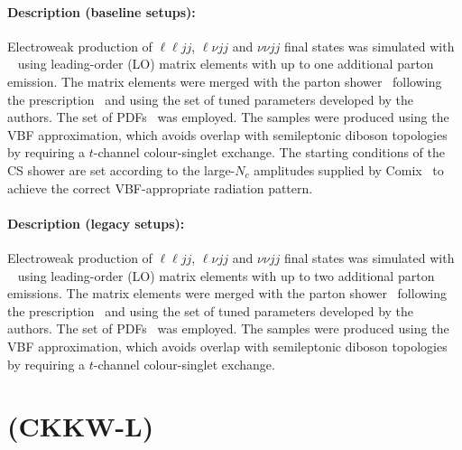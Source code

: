 \paragraph{Description (baseline setups):}

Electroweak production of \(\ell\ell jj\), \(\ell\nu jj\) and \(\nu\nu jj\) final states
was simulated with \SHERPA[2.2.11]~\cite{Bothmann:2019yzt} using
leading-order (LO) matrix elements with up to one additional parton emission.
The matrix elements were merged with the \SHERPA parton
shower~\cite{Schumann:2007mg} following the \MEPSatLO
prescription~\cite{Catani:2001cc} and using the set of tuned
parameters developed by the \SHERPA authors.
The \NNPDF[3.0nnlo] set of
PDFs~\cite{Ball:2014uwa} was employed. The samples were produced
using the VBF approximation, which avoids overlap  with semileptonic
diboson topologies by requiring a \(t\)-channel colour-singlet exchange.
The starting conditions of the CS shower are set according to the 
large-\(N_c\) amplitudes supplied by Comix~\cite{Buckley:2021gfw} to achieve 
the correct VBF-appropriate radiation pattern.


\paragraph{Description (legacy setups):}

Electroweak production of \(\ell\ell jj\), \(\ell\nu jj\) and \(\nu\nu jj\) final states
was simulated with \SHERPA[2.2.1]~\cite{Bothmann:2019yzt} using
leading-order (LO) matrix elements with up to two additional parton emissions.
The matrix elements were merged with the \SHERPA parton
shower~\cite{Schumann:2007mg} following the \MEPSatLO
prescription~\cite{Catani:2001cc} and using the set of tuned
parameters developed by the \SHERPA authors.  The \NNPDF[3.0nnlo] set of
PDFs~\cite{Ball:2014uwa} was employed. The samples were produced
using the VBF approximation, which avoids overlap  with semileptonic
diboson topologies by requiring a \(t\)-channel colour-singlet exchange.



\section[MadGraph5 (CKKW-L)]{\MADGRAPH (CKKW-L)}

